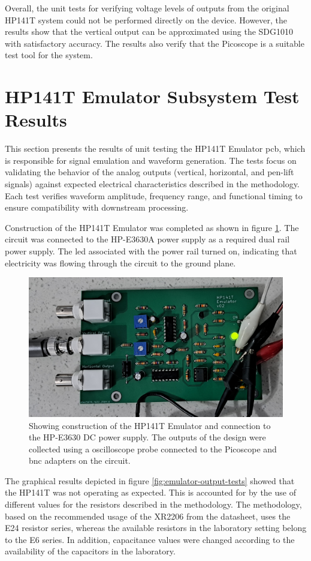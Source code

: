 \documentclass[class=report,11pt,crop=false]{standalone}
\begin{document}
	Overall, the unit tests for verifying voltage levels of outputs from the original HP141T system could not be performed directly on the device. However, the results show that the vertical output can be approximated using the SDG1010 with satisfactory accuracy. The results also verify that the Picoscope is a suitable test tool for the system.
	
	\section{HP141T Emulator Subsystem Test Results}
	
	This section presents the results of unit testing the HP141T Emulator \acrshort{pcb}, which is responsible for signal emulation and waveform generation. The tests focus on validating the behavior of the analog outputs (vertical, horizontal, and pen-lift signals) against expected electrical characteristics described in the methodology. Each test verifies waveform amplitude, frequency range, and functional timing to ensure compatibility with downstream processing.
	
	Construction of the HP141T Emulator was completed as shown in figure \ref{fig:emulator-hardware}. The circuit was connected to the HP-E3630A power supply as a required dual rail power supply. The \acrshort{led} associated with the power rail turned on, indicating that electricity was flowing through the circuit to the ground plane.
	
	\begin{figure}[ht!]
		\centering
		\includegraphics[width=0.55\linewidth]{Figures/Results/emulator-hardware}
		\caption{Showing construction of the HP141T Emulator and connection to the HP-E3630 DC power supply. The outputs of the design were collected using a oscilloscope probe connected to the Picoscope and \acrshort{bnc} adapters on the circuit.}
		\label{fig:emulator-hardware}
	\end{figure} 
	
	The graphical results depicted in figure \ref{fig:emulator-output-tests} showed that the HP141T was not operating as expected. This is accounted for by the use of different values for the resistors described in the methodology. The methodology, based on the recommended usage of the XR2206 from the datasheet, uses the E24 resistor series, whereas the available resistors in the laboratory setting belong to the E6 series. In addition, capacitance values were changed according to the availability of the capacitors in the laboratory. 
	
\end{document}
